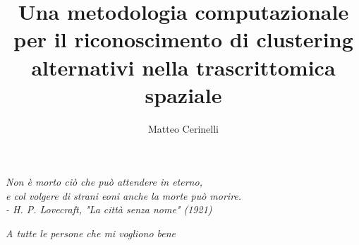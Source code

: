 \documentclass{theme/uniprthesis}
\title{Una metodologia computazionale per il riconoscimento di clustering alternativi nella trascrittomica spaziale}
\author{Matteo Cerinelli}
\newcommand\blankpage{
    \null
    \thispagestyle{empty}
    \addtocounter{page}{-1}
    \newpage
}
\begin{document}
\maketitle
\blankpage %

\newpage
\thispagestyle{empty}
\null{}
\begin{flushright}
	\textit{Non è morto ciò che può attendere in eterno,}\\
  \textit{ e col volgere di strani eoni anche la morte può morire.}\\
  \medskip
  \textit{- H. P. Lovecraft, "La città senza nome" (1921)}
\end{flushright}
\null
\newpage
\blankpage

\newpage
\thispagestyle{empty}
\null{}
\begin{flushright}
	\textit{A tutte le persone che mi vogliono bene}
\end{flushright}
\null
\newpage
\blankpage

\pagestyle{plain}
\tableofcontents

 \listoffigures    %
 \lstlistoflistings
 \listoftables     %

 
	
\pagestyle{fancy}




\pagestyle{plain}


% 

\cleardoublepage
{}


% 
\newpage
\thispagestyle{empty}
\null{}
\null
\newpage

\blankpage
\end{document}
